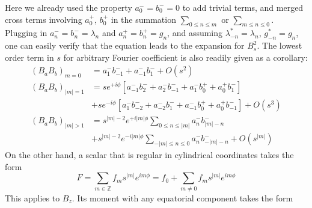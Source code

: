 Here we already used the property $a_0^- = b_0^- = 0$ to add trivial terms, and merged cross terms involving $a_0^+$, $b_0^+$ in the summation $\sum_{0\leq n \leq m}$ or $\sum_{m\leq n \leq 0}$. Plugging in $a_{n}^- = b_n^- = \lambda_n$ and $a_n^+ = b_n^+ = g_n$, and assuming $\lambda_{-n}^* = \lambda_n$, $g_{-n}^* = g_n$, one can easily verify that the equation leads to the expansion for $B_s^2$. The lowest order term in $s$ for arbitrary Fourier coefficient is also readily given as a corollary:
\begin{equation}
\begin{aligned}
    \left(B_a B_b\right)_{m=0} &= a_1^- b_{-1}^- + a_{-1}^- b_{1}^- + O\left(s^2\right) \\ 
    \left(B_a B_b\right)_{|m|=1} &= s e^{+i\phi}\left[a_{-1}^- b_{2}^- + a_{2}^- b_{-1}^- + a_1^- b_0^+ + a_0^+ b_1^-\right]\\
    &+ s e^{-i\phi}\left[a_{1}^- b_{-2}^- + a_{-2}^- b_{1}^- + a_{-1}^- b_0^+ + a_0^+ b_{-1}^-\right] + O\left(s^3\right) \\ 
    \left(B_a B_b\right)_{|m|>1} &= s^{|m|-2} e^{+i|m|\phi} \sum_{0\leq n \leq |m|} a_n^- b_{|m|-n}^- \\
    &+ s^{|m|-2} e^{-i|m|\phi} \sum_{-|m| \leq n \leq 0} a_n^- b_{-|m|-n}^- + O\left(s^{|m|}\right)
\end{aligned}
\end{equation}
On the other hand, a scalar that is regular in cylindrical coordinates takes the form
\begin{equation}
F = \sum_{m\in \mathbb{Z}} f_m s^{|m|} e^{im\phi} = f_0 + \sum_{m\neq 0} f_m s^{|m|} e^{im\phi}
\end{equation}
This applies to $B_z$. Its moment with any equatorial component takes the form
